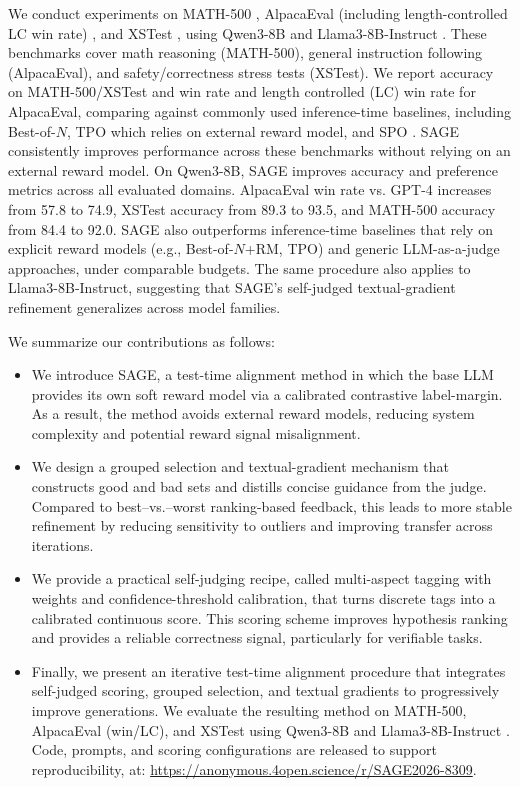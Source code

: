 \documentclass{article}
\theoremstyle{plain}
\theoremstyle{definition}
\theoremstyle{remark}
\newcommand{\method}{SAGE} %
\begin{document}
We conduct experiments on MATH-500 \citep{hendrycks2measuring}, AlpacaEval (including length-controlled LC win rate) \citep{dubois2024length}, and XSTest \citep{rottger2024xstest}, using Qwen3-8B \citep{yang2025qwen3} and Llama3-8B-Instruct \citep{grattafiori2024llama}. These benchmarks cover math reasoning (MATH-500), general instruction following (AlpacaEval), and safety/correctness stress tests (XSTest). We report accuracy on MATH-500/XSTest and win rate and length controlled (LC) win rate for AlpacaEval, comparing against commonly used inference-time baselines, including Best-of-\(N\), TPO \citep{litest} which relies on external reward model, and SPO \citep{xiang2025self}.
\method{} consistently improves performance across these benchmarks without relying on an external reward model. On Qwen3-8B, \method{} improves accuracy and preference metrics across all evaluated domains. AlpacaEval win rate vs. GPT-4 increases from 57.8 to 74.9, XSTest accuracy from 89.3 to 93.5, and MATH-500 accuracy from 84.4 to 92.0. \method{} also outperforms inference-time baselines that rely on explicit reward models (e.g., Best-of-\(N\)+RM, TPO) and generic LLM-as-a-judge approaches, under comparable budgets. The same procedure also applies to Llama3-8B-Instruct, suggesting that \method{}’s self-judged textual-gradient refinement generalizes across model families.


We summarize our contributions as follows:
\begin{itemize}
    \item We introduce \method{}, a test-time alignment method in which the base LLM provides its own soft reward model via a calibrated contrastive label-margin. As a result, the method avoids external reward models, reducing system complexity and potential reward signal misalignment.
    \item We design a grouped selection and textual-gradient mechanism that constructs good and bad sets and distills concise guidance from the judge. Compared to best–vs.–worst ranking-based feedback, this leads to more stable refinement by reducing sensitivity to outliers and improving transfer across iterations.
    \item We provide a practical self-judging recipe, called multi-aspect tagging with weights and confidence-threshold calibration, that turns discrete tags into a calibrated continuous score. This scoring scheme improves hypothesis ranking and provides a reliable correctness signal, particularly for verifiable tasks.
   
    \item Finally, we present an iterative test-time alignment procedure that integrates self-judged scoring, grouped selection, and textual gradients to progressively improve generations. We evaluate the resulting method on MATH-500, AlpacaEval (win/LC), and XSTest using Qwen3-8B \citep{yang2025qwen3} and Llama3-8B-Instruct \citep{grattafiori2024llama}. Code, prompts, and scoring configurations are released to support reproducibility, at: \url{https://anonymous.4open.science/r/SAGE2026-8309}.
\end{itemize}
\end{document}
